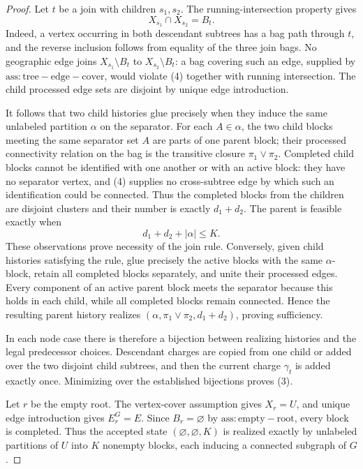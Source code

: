 \documentclass{article}
\begin{document}
\begin{proof}
Let \(t\) be a join with children \(s_1,s_2\).  The running-intersection property gives
\[
 X_{s_1}\cap X_{s_2}=B_t.
\tag{4}
\]
Indeed, a vertex occurring in both descendant subtrees has a bag path through \(t\), and the reverse inclusion follows from equality of the three join bags.  No geographic edge joins \(X_{s_1}\setminus B_t\) to \(X_{s_2}\setminus B_t\): a bag covering such an edge, supplied by \(\mathrm{ass:tree-edge-cover}\), would violate (4) together with running intersection.  The child processed edge sets are disjoint by unique edge introduction.

It follows that two child histories glue precisely when they induce the same unlabeled partition \(\alpha\) on the separator.  For each \(A\in\alpha\), the two child blocks meeting the same separator set \(A\) are parts of one parent block; their processed connectivity relation on the bag is the transitive closure \(\pi_1\vee\pi_2\).  Completed child blocks cannot be identified with one another or with an active block: they have no separator vertex, and (4) supplies no cross-subtree edge by which such an identification could be connected.  Thus the completed blocks from the children are disjoint clusters and their number is exactly \(d_1+d_2\).  The parent is feasible exactly when
\[
 d_1+d_2+|\alpha|\le K.
\tag{5}
\]
These observations prove necessity of the join rule.  Conversely, given child histories satisfying the rule, glue precisely the active blocks with the same \(\alpha\)-block, retain all completed blocks separately, and unite their processed edges.  Every component of an active parent block meets the separator because this holds in each child, while all completed blocks remain connected.  Hence the resulting parent history realizes \((\alpha,\pi_1\vee\pi_2,d_1+d_2)\), proving sufficiency.

In each node case there is therefore a bijection between realizing histories and the legal predecessor choices.  Descendant charges are copied from one child or added over the two disjoint child subtrees, and then the current charge \(\gamma_t\) is added exactly once.  Minimizing over the established bijections proves (3).

Let \(r\) be the empty root.  The vertex-cover assumption gives \(X_r=U\), and unique edge introduction gives \(E_r^G=E\).  Since \(B_r=\varnothing\) by \(\mathrm{ass:empty-root}\), every block is completed.  Thus the accepted state \((\varnothing,\varnothing,K)\) is realized exactly by unlabeled partitions of \(U\) into \(K\) nonempty blocks, each inducing a connected subgraph of \(G\).


\end{proof}
\end{document}
